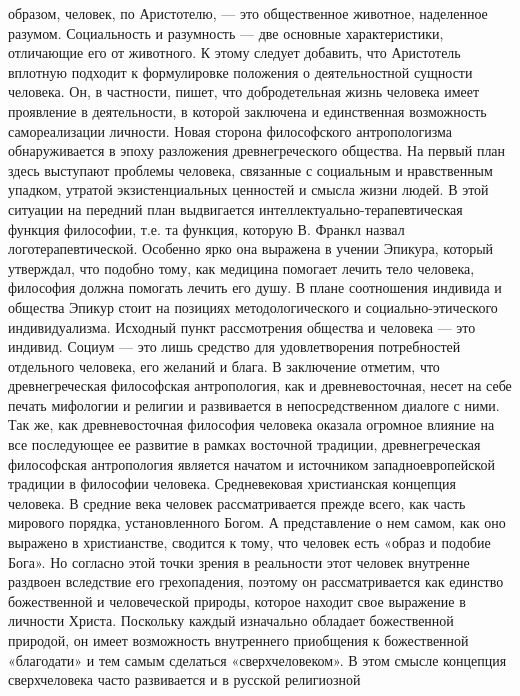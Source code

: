 \documentclass[12pt]{article}
\begin{document}
образом,  человек,  по  Аристотелю,  —  это  общественное  животное,  наделенное  разумом.  Социальность  и
разумность — две основные характеристики, отличающие его от животного.
К этому следует добавить, что Аристотель вплотную подходит к формулировке положения о деятельностной
сущности  человека.  Он,  в  частности,  пишет,  что  добродетельная  жизнь  человека  имеет  проявление  в
деятельности, в которой заключена и единственная возможность самореализации личности.
Новая сторона философского антропологизма обнаруживается в эпоху разложения древнегреческого общества.
На  первый  план  здесь  выступают  проблемы  человека,  связанные  с  социальным  и  нравственным  упадком,
утратой экзистенциальных ценностей и смысла жизни людей. В этой ситуации на передний план выдвигается
интеллектуально-терапевтическая  функция  философии,  т.е.  та  функция,  которую  В.  Франкл  назвал
логотерапевтической. Особенно ярко она выражена в учении Эпикура, который утверждал, что подобно тому,
как  медицина  помогает  лечить  тело  человека,  философия  должна  помогать  лечить  его  душу.  В  плане
соотношения  индивида  и  общества  Эпикур  стоит  на  позициях  методологического  и  социально-этического
индивидуализма. Исходный пункт рассмотрения общества и человека — это индивид. Социум — это лишь
средство для удовлетворения потребностей отдельного человека, его желаний и блага.
В заключение отметим, что древнегреческая философская антропология, как и древневосточная, несет на себе
печать мифологии и религии и развивается в непосредственном диалоге с ними.
Так же, как древневосточная философия человека оказала огромное влияние на все последующее ее развитие в
рамках  восточной  традиции,  древнегреческая  философская  антропология  является  начатом  и  источником
западноевропейской традиции в философии человека.
Средневековая христианская концепция человека.
В средние века человек рассматривается прежде всего, как часть мирового порядка, установленного Богом. А
представление о нем самом, как оно выражено в христианстве, сводится к тому, что человек есть «образ и
подобие Бога». Но согласно этой точки зрения в реальности этот человек внутренне раздвоен вследствие его
грехопадения,  поэтому  он  рассматривается  как  единство  божественной  и  человеческой  природы,  которое 
находит свое выражение в личности Христа. Поскольку каждый изначально обладает божественной природой,
он  имеет  возможность  внутреннего  приобщения  к  божественной  «благодати»  и  тем  самым  сделаться
«сверхчеловеком».  В  этом  смысле  концепция  сверхчеловека  часто  развивается  и  в  русской  религиозной
\end{document}
